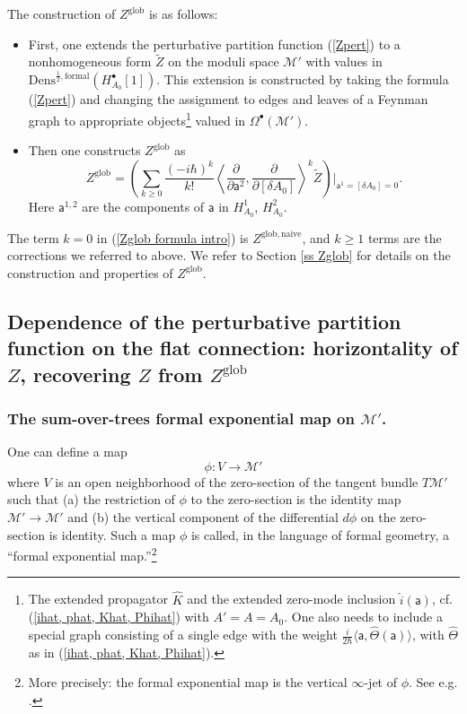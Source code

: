 \documentclass[11pt,a4paper]{amsart}
\theoremstyle{plain} %
\theoremstyle{definition}
\theoremstyle{remark}
\newcommand{\mr}{\mathrm}
\newcommand{\sfa}{\mathsf{a}}
\newcommand{\bt}{\bullet}
\newcommand{\ra}{\rightarrow}
\newcommand{\M}{\mathcal{M}}
\newcommand{\wh}{\widehat}
\newcommand{\til}{\widetilde}
\begin{document}
The construction of $Z^\mr{glob}$ is as follows:
\begin{itemize}
    \item First, one extends the perturbative partition function (\ref{Zpert}) to a nonhomogeneous form $\til{Z}$ on the moduli space $\M'$ with values in $\mr{Dens}^{\frac12,\mr{formal}}(H_{A_0}^\bt[1])$. 
    This extension is constructed by taking the formula (\ref{Zpert}) and changing the assignment to edges and leaves of a Feynman graph to appropriate objects\footnote{
    The extended propagator $\wh{K}$ and the extended zero-mode inclusion $\wh{i}(\sfa)$, cf. (\ref{ihat, phat, Khat, Phihat}) with $A'=A=A_0$. One also needs to include a special graph consisting of a single edge with the weight $\frac{i}{2\hbar} \langle \sfa, \wh\Theta(\sfa)\rangle$, with $\wh\Theta$ as in (\ref{ihat, phat, Khat, Phihat}).
    } valued in $\Omega^\bt(\M')$.
    \item Then one constructs $Z^\mr{glob}$ as 
    \begin{equation}\label{Zglob formula intro}
        Z^\mr{glob}=\left(\sum_{k\geq 0}\frac{(-i\hbar)^k}{k!}\left\langle \frac{\partial}{\partial \sfa^2},\frac{\partial}{\partial [\delta A_0]} \right\rangle^k \til{Z} \right)\Bigg|_{\sfa^1=[\delta A_0]=0}.
    \end{equation}
    Here $\sfa^{1,2}$ are the components of $\sfa$ in $H^1_{A_0}$, $H^2_{A_0}$.
\end{itemize}
The term $k=0$ in (\ref{Zglob formula intro}) is $Z^\mr{glob,naive}$, and $k\geq 1$ terms are the corrections we referred to above. We refer to Section \ref{ss Zglob} for details on the construction and properties of $Z^\mr{glob}$.



\subsection{Dependence of the perturbative partition function on the flat connection: horizontality of $Z$, recovering $Z$ from $Z^\mr{glob}$}%
\subsubsection{The sum-over-trees formal exponential map on $\M'$.}
One can define a map %
\begin{equation}
    \phi\colon V \ra \M'
\end{equation}
where $V$ is an open neighborhood of the zero-section of the tangent bundle $T\M'$ such that (a) the restriction of $\phi$ to the zero-section is the identity map $\M'\ra \M'$ and (b) the vertical component of the differential $d\phi$ on the zero-section is identity. Such a map $\phi$ is called, in the language of formal geometry, a ``formal exponential map.''\footnote{More precisely: the formal exponential map is the vertical $\infty$-jet of $\phi$. See e.g. \cite{Bonechi2012}.}
\end{document}
